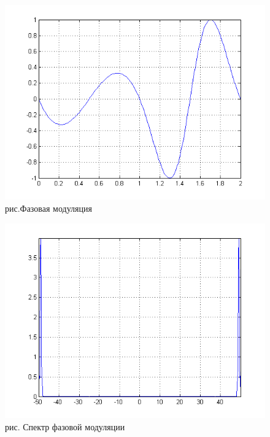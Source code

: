 \documentclass[10pt,a4paper]{report}
\begin{document}
\begin{figure}
\begin{center}
\includegraphics[angle=0, scale = 0.8]{8_5}\newline
рис.Фазовая модуляция\newline
\end{center}
\end{figure}
\begin{figure}
\begin{center}
\includegraphics[angle=0, scale = 0.8]{8_6}\newline
рис. Спектр фазовой модуляции\newline
\end{center}
\end{figure}
\end{document}
